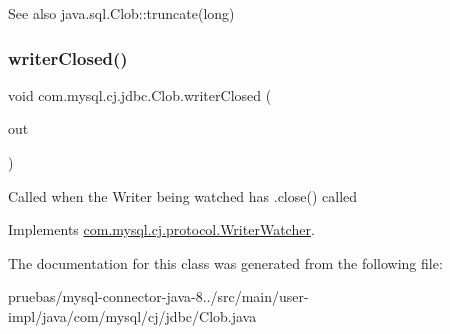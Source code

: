 \begin{DoxySeeAlso}{See also}
java.\+sql.\+Clob\+::truncate(long) 
\end{DoxySeeAlso}
\mbox{\label{classcom_1_1mysql_1_1cj_1_1jdbc_1_1_clob_ab6d96b9b821f777e7b25850ceb480c2b}} 
\subsubsection{\texorpdfstring{writer\+Closed()}{writerClosed()}}
{\footnotesize\ttfamily void com.\+mysql.\+cj.\+jdbc.\+Clob.\+writer\+Closed (\begin{DoxyParamCaption}\item[{\mbox{\hyperlink{classcom_1_1mysql_1_1cj_1_1protocol_1_1_watchable_writer}{Watchable\+Writer}}}]{out }\end{DoxyParamCaption})}

Called when the Writer being watched has .close() called 

Implements \mbox{\hyperlink{interfacecom_1_1mysql_1_1cj_1_1protocol_1_1_writer_watcher_a12b4673c6a8478886d9d53dae4afe032}{com.\+mysql.\+cj.\+protocol.\+Writer\+Watcher}}.



The documentation for this class was generated from the following file\+:\begin{DoxyCompactItemize}
\item 
pruebas/mysql-\/connector-\/java-\/8../src/main/user-\/impl/java/com/mysql/cj/jdbc/Clob.\+java\end{DoxyCompactItemize}
